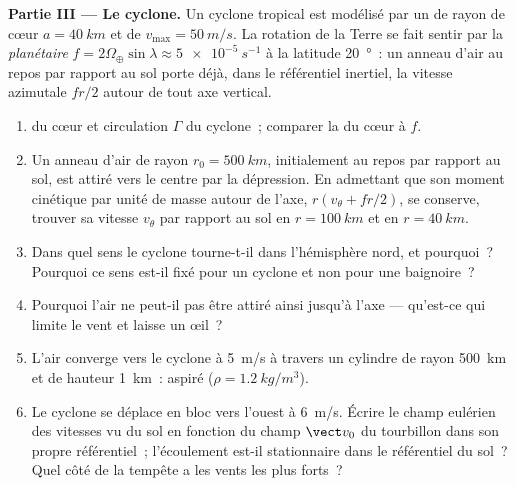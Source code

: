\begin{problem}
\medskip
\noindent\textbf{Partie III --- Le cyclone.}
Un cyclone tropical est modélisé par un  de rayon de cœur
$a = \qty{40}{km}$ et de $v_{\max} = \qty{50}{m/s}$. La rotation de la Terre se
fait sentir par la \emph{ planétaire} $f = 2\Omega_\oplus\sin\lambda
\approx \qty{5e-5}{s^{-1}}$ à la latitude \qty{20}{\degree}~: un anneau d'air au
repos par rapport au sol porte déjà, dans le référentiel inertiel, la
vitesse azimutale $fr/2$ autour de tout axe vertical.
\begin{enumerate}[resume]
  \item {} du cœur et circulation $\Gamma$ du cyclone~;
        comparer la  du cœur à $f$.
  \item Un anneau d'air de rayon $r_0 = \qty{500}{km}$, initialement au repos
        par rapport au sol, est attiré vers le centre par la
        dépression. En admettant que son moment cinétique par unité de masse
        autour de l'axe, $r(v_\theta + fr/2)$, se conserve, trouver sa
        vitesse $v_\theta$ par rapport au sol en $r = \qty{100}{km}$
        et en $r = \qty{40}{km}$.
  \item Dans quel sens le cyclone tourne-t-il dans l'hémisphère
        nord, et pourquoi~? Pourquoi ce sens est-il fixé pour un cyclone et
        non pour une baignoire~?
  \item Pourquoi l'air ne peut-il pas être attiré ainsi jusqu'à l'axe ---
        qu'est-ce qui limite le vent et laisse un œil~?
  \item L'air converge vers le cyclone à \qty{5}{m/s} à travers un
        cylindre de rayon \qty{500}{km} et de hauteur \qty{1}{km}~:  aspiré ($\rho = \qty{1.2}{kg/m^3}$).
  \item Le cyclone se déplace en bloc vers l'ouest à \qty{6}{m/s}. Écrire le
        champ eulérien des vitesses vu du sol en fonction du
        champ $\vect v_0$ du tourbillon dans son propre référentiel~; l'écoulement est-il
        stationnaire dans le référentiel du sol~? Quel côté de la tempête a les
        vents les plus forts~?
\end{enumerate}


\end{problem}
